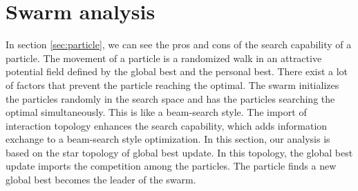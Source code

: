 \section{Swarm analysis}
\label{sec:swarm}




In section \ref{sec:particle}, we can see the pros and cons of the search capability of a particle.
The movement of a particle is a randomized walk in an attractive potential field defined by the global best and the personal best.
There exist a lot of factors that prevent the particle reaching the optimal.
The swarm initializes the particles randomly in the search space and has the particles searching the optimal simultaneously.
This is like a beam-search style.
The import of interaction topology enhances the search capability, which adds information exchange to a beam-search style optimization.
In this section, our analysis is based on the star topology of global best update.
In this topology, the global best update imports the competition among the particles.
The particle finds a new global best becomes the leader of the swarm.


